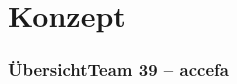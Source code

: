 \section{Konzept}

\author{Ervin Mazlagi\'c}

\begin{frame}
	\frametitle{Übersicht\hfill{}\footnotesize Team 39 -- accefa}
	
\end{frame}




